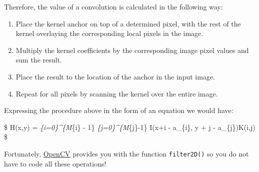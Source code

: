 \documentclass[11pt]{article}
\providecommand{\tightlist}{%
      \setlength{\itemsep}{0pt}\setlength{\parskip}{0pt}}
\begin{document}
Therefore, the value of a convolution is calculated in the following
way:

\begin{enumerate}
\def\labelenumi{\arabic{enumi})}
\tightlist
\item
  Place the kernel anchor on top of a determined pixel, with the rest of
  the kernel overlaying the corresponding local pixels in the image.
\item
  Multiply the kernel coefficients by the corresponding image pixel
  values and sum the result.
\item
  Place the result to the location of the anchor in the input image.
\item
  Repeat for all pixels by scanning the kernel over the entire image.
\end{enumerate}

Expressing the procedure above in the form of an equation we would have:

\$ H(x,y) = \sum\emph{\{i=0\}\^{}\{M}\{i\} - 1\}
\sum\emph{\{j=0\}\^{}\{M}\{j\}-1\} I(x+i - a\_\{i\}, y + j -
a\_\{j\})K(i,j) \$

Fortunately,
\href{https://docs.opencv.org/2.4/doc/tutorials/imgproc/imgtrans/filter_2d/filter_2d.html}{OpenCV}
provides you with the function \texttt{filter2D()} so you do not have to
code all these operations!
\end{document}
